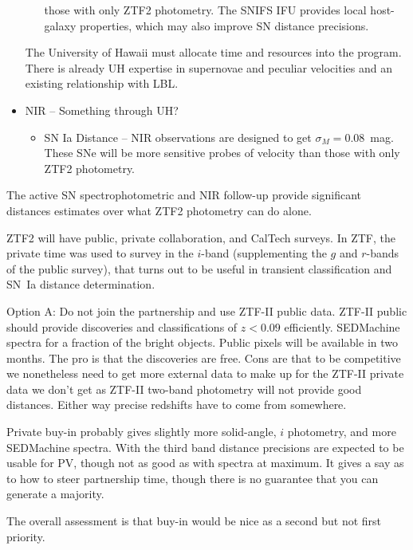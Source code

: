 \begin{itemize}
\begin{itemize}
those with only ZTF2 photometry.  The SNIFS IFU provides local host-galaxy properties, which may also improve SN distance precisions.
\end{itemize}
The University of Hawaii must allocate time and resources into the program.  There is already UH expertise in supernovae and peculiar velocities and an existing relationship
with LBL.
\item NIR -- Something through UH?
\begin{itemize}
\item SN Ia Distance -- NIR observations are designed to get $\sigma_M=0.08$~mag.  These SNe will be more sensitive probes of velocity
than those with only ZTF2 photometry.
\end{itemize}
\end{itemize}
The active SN spectrophotometric and NIR follow-up provide significant distances estimates over
what ZTF2 photometry can do alone.




ZTF2 will have public, private collaboration, and CalTech surveys.    In ZTF,
the private time was used to survey in the $i$-band (supplementing the $g$ and $r$-bands of the public survey), that turns out to be useful in transient classification and SN~Ia distance determination.

Option A: Do not join the partnership and use ZTF-II public data.
ZTF-II public should provide discoveries and classifications of $z<0.09$ efficiently.  SEDMachine spectra for a
fraction of the bright objects.  Public pixels will be available in two months.
The pro is that the discoveries are free.
Cons are  that to be competitive we nonetheless need to get more external data to make up for the ZTF-II private data
we don't get as ZTF-II two-band photometry will not provide good distances.  
Either way precise redshifts have to come from somewhere.


Private buy-in probably gives slightly more solid-angle, $i$ photometry, and more SEDMachine spectra.  With the third band distance precisions are expected
to be usable for PV, though not as good as with spectra at maximum.  It gives a say as to how to steer partnership time, though there is no guarantee that
you can generate a majority.

The overall assessment is that buy-in would be nice as a second but not first priority.

